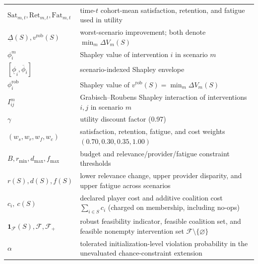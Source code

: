 \documentclass[review]{elsarticle}
\theoremstyle{plain}
\theoremstyle{definition}
\theoremstyle{remark}
\newcommand{\Utility}{V}
\newcommand{\Shap}{\phi}
\begin{document}
\begin{appendices}
\begin{longtable}{@{}p{}p{}@{}}
$\mathrm{Sat}_{m,t},\mathrm{Ret}_{m,t},\mathrm{Fat}_{m,t}$ & time-$t$ cohort-mean satisfaction, retention, and fatigue used in utility\\
$\underline{\Delta}(S),v^{\mathrm{rob}}(S)$ & worst-scenario improvement; both denote $\min_m\Delta\Utility_m(S)$\\
$\Shap_i^m$ & Shapley value of intervention $i$ in scenario $m$\\
$[\underline{\Shap}_i,\overline{\Shap}_i]$ & scenario-indexed Shapley envelope\\
$\phi_i^{\mathrm{rob}}$ & Shapley value of $v^{\mathrm{rob}}(S)=\min_m\Delta\Utility_m(S)$\\
$I_{ij}^m$ & Grabisch--Roubens Shapley interaction of interventions $i,j$ in scenario $m$\\
$\gamma$ & utility discount factor (0.97)\\
$(w_s,w_r,w_f,w_c)$ & satisfaction, retention, fatigue, and cost weights $(0.70,0.30,0.35,1.00)$\\
$B,r_{\min},d_{\max},f_{\max}$ & budget and relevance/provider/fatigue constraint thresholds\\
$r(S),d(S),f(S)$ & lower relevance change, upper provider disparity, and upper fatigue across scenarios\\
$c_i,\ c(S)$ & declared player cost and additive coalition cost $\sum_{i\in S}c_i$ (charged on membership, including no-ops)\\
$\mathbf 1_{\mathcal F}(S),\mathcal F,\mathcal F_+$ & robust feasibility indicator, feasible coalition set, and feasible nonempty intervention set $\mathcal F\setminus\{\varnothing\}$\\
$\alpha$ & tolerated initialization-level violation probability in the unevaluated chance-constraint extension\\
\end{longtable}
\endgroup


\end{appendices}
\end{document}
